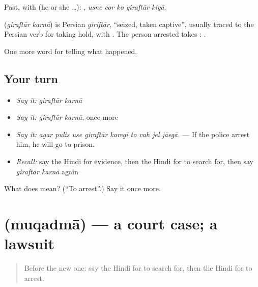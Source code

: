 Past, with  (he or she …):     , \emph{usne cor ko giraftār kiyā}.

\begin{cousinweb}
\textbf{ } (\emph{giraftār karnā}) is Persian \emph{giriftār}, \textquotedblleft{}seized, taken captive\textquotedblright{}, usually traced to the Persian verb for taking hold, with \textbf{}. The person arrested takes \textbf{}: \textbf{   }.
\end{cousinweb}

\begin{grammarlens}[title={What you've built}]
One more word for telling what happened.
\end{grammarlens}

\subsection*{Your turn}
\begin{itemize}
\raggedright
  \item \emph{Say it:} \emph{giraftār karnā}
  \item \emph{Say it:} \emph{giraftār karnā}, once more
  \item \emph{Say it:} \emph{agar pulis use giraftār karegī to vah jel jāegā.} — If the police arrest him, he will go to prison.
  \item \emph{Recall:} say the Hindi for evidence, then the Hindi for to search for, then say \emph{giraftār karnā} again
\end{itemize}

\begin{tcolorbox}[breakable,colback=teal!4,colframe=teal!35!black,title={Before you move on}]
What does   mean? (\textquotedblleft{}To arrest\textquotedblright{}.) Say it once more.
\end{tcolorbox}
\section[\texorpdfstring{\hi{मुक़दमा} (muqadmā)}{मुक़दमा (muqadmā)}]{ (muqadmā) — a court case; a lawsuit}

\label{lesson:HI-C295-muqadma}



\begin{quote}
Before the new one: say the Hindi for to search for, then the Hindi for to arrest.
\end{quote}

